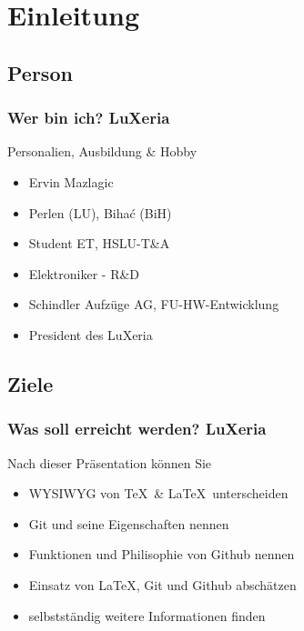 \section{Einleitung}

\subsection{Person}
\begin{frame}
	\frametitle{Wer bin ich? \hfill{} \footnotesize{LuXeria}}
	\begin{block}{Personalien, Ausbildung \& Hobby}
		\begin{itemize}
			\item Ervin Mazlagic
			\item Perlen (LU), Biha\'c (BiH)
			\item Student ET, HSLU-T\&A
			\item Elektroniker - R\&D
			\item Schindler Aufzüge AG, FU-HW-Entwicklung
			\item President des LuXeria
		\end{itemize}
	\end{block}
\end{frame}

\subsection{Ziele}
\begin{frame}
	\frametitle{Was soll erreicht werden? \hfill{} \footnotesize{LuXeria}}
	\begin{block}{Nach dieser Präsentation können Sie}
		\begin{itemize}
			\item WYSIWYG von \TeX~\& \LaTeX~unterscheiden
			\item Git und seine Eigenschaften nennen
			\item Funktionen und Philisophie von Github nennen
			\item Einsatz von \LaTeX, Git und Github abschätzen
			\item selbstständig weitere Informationen finden
		\end{itemize}
	\end{block}
\end{frame}

